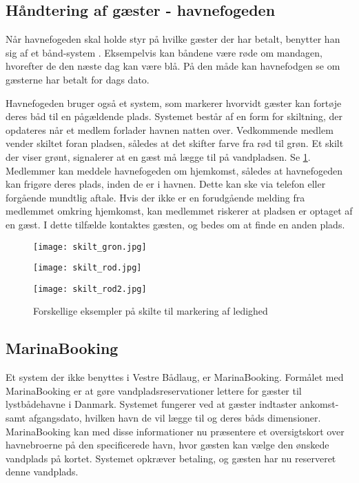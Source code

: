 \subsection{Håndtering af gæster - havnefogeden} %
\label{sub:gaster_havnefogeden}

Når havnefogeden skal holde styr på hvilke gæster der har betalt, benytter han sig af et bånd-system \cite{int_hf}. Eksempelvis kan båndene være røde om mandagen, hvorefter de den næste dag kan være blå. På den måde kan havnefodgen se om gæsterne har betalt for dags dato.

Havnefogeden bruger også et system, som markerer hvorvidt gæster kan fortøje deres båd til en pågældende plads. Systemet består af en form for skiltning, der opdateres når et medlem forlader havnen natten over. Vedkommende medlem vender skiltet foran pladsen, således at det skifter farve fra rød til grøn. Et skilt der viser grønt, signalerer at en gæst må lægge til på vandpladsen. Se \cref{fig:skilte}. Medlemmer kan meddele havnefogeden om hjemkomst, således at havnefogeden kan frigøre deres plads, inden de er i havnen. Dette kan ske via telefon eller forgående mundtlig aftale. Hvis der ikke er en forudgående melding fra medlemmet omkring hjemkomst, kan medlemmet riskerer at pladsen er optaget af en gæst. I dette tilfælde kontaktes gæsten, og bedes om at finde en anden plads.

\begin{figure}[h]
  \centering
  \begin{minipage}{0.30\textwidth}
    \texttt{[image: skilt\_gron.jpg]}
  \end{minipage}
  \begin{minipage}{0.30\textwidth}
    \texttt{[image: skilt\_rod.jpg]}
  \end{minipage}
  \begin{minipage}{0.30\textwidth}
    \texttt{[image: skilt\_rod2.jpg]}
  \end{minipage}
  \caption{Forskellige eksempler på skilte til markering af ledighed}
  \label{fig:skilte}
\end{figure}

\subsection{MarinaBooking} %
\label{sub:MarinaBooking}

Et system der ikke benyttes i Vestre Bådlaug, er MarinaBooking. Formålet med MarinaBooking \cite{marinabooking} er at gøre vandpladsreservationer lettere for gæster til lystbådehavne i Danmark. Systemet fungerer ved at gæster indtaster ankomst- samt afgangsdato, hvilken havn de vil lægge til og deres båds dimensioner. MarinaBooking kan med disse informationer nu præsentere et oversigtskort over havnebroerne på den specificerede havn, hvor gæsten kan vælge den ønskede vandplads på kortet. Systemet opkræver betaling, og gæsten har nu reserveret denne vandplads.

